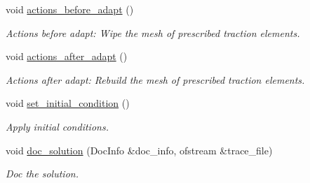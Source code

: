 \begin{DoxyCompactItemize}
void \hyperlink{classCollapsibleChannelProblem_a54abc5259d590154e5dfa458d885c16c}{actions\+\_\+before\+\_\+adapt} ()
\begin{DoxyCompactList}\small\item\em Actions before adapt\+: Wipe the mesh of prescribed traction elements. \end{DoxyCompactList}\item 
void \hyperlink{classCollapsibleChannelProblem_a3ea01d83f0256c588a652741c6c33e0e}{actions\+\_\+after\+\_\+adapt} ()
\begin{DoxyCompactList}\small\item\em Actions after adapt\+: Rebuild the mesh of prescribed traction elements. \end{DoxyCompactList}\item 
void \hyperlink{classCollapsibleChannelProblem_a646147fb75669cfcc5bb56ee79d9b8da}{set\+\_\+initial\+\_\+condition} ()
\begin{DoxyCompactList}\small\item\em Apply initial conditions. \end{DoxyCompactList}\item 
void \hyperlink{classCollapsibleChannelProblem_afc4af9796c01d904d4074bd5bbfc5b9b}{doc\+\_\+solution} (Doc\+Info \&doc\+\_\+info, ofstream \&trace\+\_\+file)
\begin{DoxyCompactList}\small\item\em Doc the solution. \end{DoxyCompactList}\end{DoxyCompactItemize}

